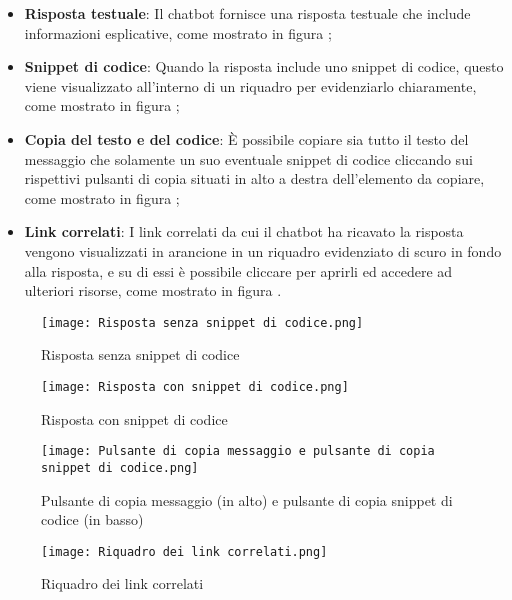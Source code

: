 \begin{itemize}
  \item \textbf{Risposta testuale}: Il chatbot fornisce una risposta testuale che include informazioni esplicative, come mostrato in figura ;
  \item \textbf{Snippet di codice}: Quando la risposta include uno snippet di codice, questo viene visualizzato all'interno di un riquadro per evidenziarlo chiaramente, come mostrato in figura ;
  \item \textbf{Copia del testo e del codice}: È possibile copiare sia tutto il testo del messaggio che solamente un suo eventuale snippet di codice cliccando sui rispettivi pulsanti di copia situati in alto a destra dell'elemento da copiare, come mostrato in figura ;
  \item \textbf{Link correlati}: I link correlati da cui il chatbot ha ricavato la risposta vengono visualizzati in arancione in un riquadro evidenziato di scuro in fondo alla risposta, e su di essi è possibile cliccare per aprirli ed accedere ad ulteriori risorse, come mostrato in figura .
\end{itemize}

\newpage
\begin{figure}[h]
    \centering
        \texttt{[image: Risposta senza snippet di codice.png]}
        \caption{Risposta senza snippet di codice}
        \label{fig:Risposta senza snippet di codice}        
\end{figure}
\begin{figure}[h]
    \centering
        \texttt{[image: Risposta con snippet di codice.png]}
        \caption{Risposta con snippet di codice}
        \label{fig:Risposta con snippet di codice}        
\end{figure}
\begin{figure}[h]
    \centering
        \texttt{[image: Pulsante di copia messaggio e pulsante di copia snippet di codice.png]}
        \caption{Pulsante di copia messaggio (in alto) e pulsante di copia snippet di codice (in basso)}
        \label{fig:Pulsante di copia messaggio e pulsante di copia snippet di codice}        
\end{figure}
\begin{figure}[h]
    \centering
        \texttt{[image: Riquadro dei link correlati.png]}
        \caption{Riquadro dei link correlati}
        \label{fig:Riquadro dei link correlati}        
\end{figure}

